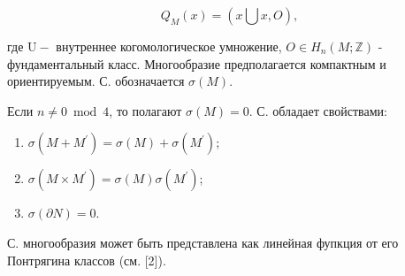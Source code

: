 \documentclass[10pt]{article}
\begin{document}
\[

Q_{M}(x)=(x \bigcup x, O),

\]



где $\mathrm{U}-$ внутреннее когомологическое умножение, $O \in H_{n}(M ; \mathbb{Z})$ - фундаментальный класс. Многообразие предполагается компактным и ориентируемым. С. обозначается $\sigma(M)$.



Если $n \neq 0 \bmod 4$, то полагают $\sigma(M)=0$. С. обладает свойствами:



\begin{enumerate}

  \item $\sigma\left(M+M^{\prime}\right)=\sigma(M)+\sigma\left(M^{\prime}\right)$;



  \item $\sigma\left(M \times M^{\prime}\right)=\sigma(M) \sigma\left(M^{\prime}\right)$;



  \item $\sigma(\partial N)=0$.



\end{enumerate}



С. многообразия может быть представлена как линейная фупкция от его Понтрягина классов (см. [2]).
\end{document}
